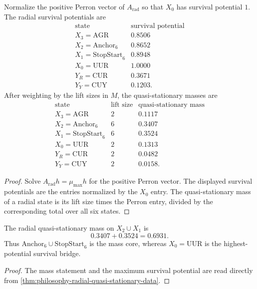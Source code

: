 \begin{theorem}
\label{thm:philosophy-radial-quasi-stationary-data}
Normalize the positive Perron vector of $A_{\mathrm{rad}}$ so that
$X_{0}$ has survival potential $1$. The radial survival potentials are
$$
\begin{array}{c|r}
  \text{state} & \text{survival potential}\\
  \hline
  X_{3}=\mathrm{AGR} & 0.8506\\
  X_{2}=\mathrm{Anchor}_{6} & 0.8652\\
  X_{1}=\mathrm{StopStart}_{6} & 0.8948\\
  X_{0}=\mathrm{UUR} & 1.0000\\
  Y_{R}=\mathrm{CUR} & 0.3671\\
  Y_{Y}=\mathrm{CUY} & 0.1203.
\end{array}
$$
After weighting by the lift sizes in $M$, the quasi-stationary masses are
$$
\begin{array}{c|r|r}
  \text{state} & \text{lift size} & \text{quasi-stationary mass}\\
  \hline
  X_{3}=\mathrm{AGR} & 2 & 0.1117\\
  X_{2}=\mathrm{Anchor}_{6} & 6 & 0.3407\\
  X_{1}=\mathrm{StopStart}_{6} & 6 & 0.3524\\
  X_{0}=\mathrm{UUR} & 2 & 0.1313\\
  Y_{R}=\mathrm{CUR} & 2 & 0.0482\\
  Y_{Y}=\mathrm{CUY} & 2 & 0.0158.
\end{array}
$$
\end{theorem}
\begin{proof}
Solve $A_{\mathrm{rad}}h=\mu_{\max}h$ for the positive Perron vector.
The displayed survival potentials are the entries normalized by the
$X_{0}$ entry. The quasi-stationary mass of a radial state is its lift
size times the Perron entry, divided by the corresponding total over
all six states.
\end{proof}

\begin{corollary}
\label{cor:philosophy-radial-mass-core-survival-bridge}
The radial quasi-stationary mass on
$X_{2}\cup X_{1}$ is
$$
  0.3407+0.3524=0.6931.
$$
Thus $\mathrm{Anchor}_{6}\cup\mathrm{StopStart}_{6}$ is the mass core,
whereas $X_{0}=\mathrm{UUR}$ is the highest-potential survival bridge.
\end{corollary}
\begin{proof}
The mass statement and the maximum survival potential are read directly
from \autoref{thm:philosophy-radial-quasi-stationary-data}.
\end{proof}

